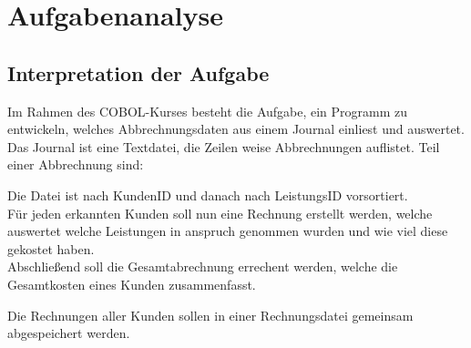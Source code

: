 \chapter{Aufgabenanalyse}\label{ch:aufgabenanalyse}


\section{Interpretation der Aufgabe}\label{sec:interpretation-der-aufgabe}
Im Rahmen des COBOL-Kurses besteht die Aufgabe, ein Programm zu entwickeln, welches Abbrechnungsdaten aus einem Journal einliest und auswertet.\\
\noindent
Das Journal ist eine Textdatei, die Zeilen weise Abbrechnungen auflistet. Teil einer Abbrechnung sind: 


\noindent

Die Datei ist nach KundenID und danach nach LeistungsID vorsortiert.\\

Für jeden erkannten Kunden soll nun eine Rechnung erstellt werden, welche auswertet welche Leistungen in anspruch genommen wurden und wie viel diese gekostet haben.\\

Abschließend soll die Gesamtabrechnung errechent werden, welche die Gesamtkosten eines Kunden zusammenfasst.

Die Rechnungen aller Kunden sollen in einer Rechnungsdatei gemeinsam abgespeichert werden.

